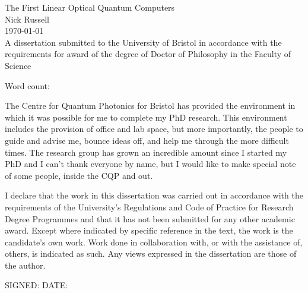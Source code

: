 \begin{titlepage}
  \begin{center}
    {\LARGE The First Linear Optical Quantum Computers}\\[1.5cm]
    {\Large Nick Russell}\\[1.5cm]
    {\today}\\[12.0cm]
    {A dissertation submitted to the University of Bristol in accordance with
    the requirements for award of the degree of Doctor of Philosophy in the
    Faculty of Science}
  \end{center}
  \begin{flushright}
    Word count: 
  \end{flushright}
\end{titlepage}

\begin{abstract}
  Each copy must include an abstract or summary of the dissertation in not more
  than 300 words, on one side of A4, which should be single-spaced in a font
  size in the range 10 to 12.
\end{abstract}

\begin{acknowledgements}
  The Centre for Quantum Photonics for Bristol has provided the environment in
  which it was possible for me to complete my PhD research. This environment
  includes the provision of office and lab space, but more importantly, the
  people to guide and advise me, bounce ideas off, and help me through the more
  difficult times. The research group has grown an incredible amount since I
  started my PhD and I can't thank everyone by name, but I would like to make
  special note of some people, inside the CQP and out.
\end{acknowledgements}

\begin{declaration}
  I declare that the work in this dissertation was carried out in accordance
  with the requirements of the University's Regulations and Code of Practice for
  Research Degree Programmes and that it has not been submitted for any other
  academic award. Except where indicated by specific reference in the text, the
  work is the candidate's own work. Work done in collaboration with, or with the
  assistance of, others, is indicated as such. Any views expressed in the
  dissertation are those of the author.

  SIGNED: \dotfill DATE: \dotfill
\end{declaration}

\tableofcontents
\listoffigures

